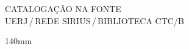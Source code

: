 %
% 


\begin{titlepage}
	\begin{center}
\vfill
\singlespacing
	\vspace*{95mm}
	{CATALOGAÇÃO NA FONTE\\ \vspace{1.5mm}
	UERJ\,/\,REDE SIRIUS\,/\,BIBLIOTECA CTC/B}\\
	\vspace{1.5mm}
	\begin{boxedminipage}{140mm}
	\begin{minipage}{5mm}
		\vspace{-84mm}
	\end{minipage}
	\hfill
	\raisebox{8.5mm}{
	\begin{minipage}[top]{115mm}
		\vspace*{5mm}


\end{minipage}}
\end{boxedminipage}
\end{center}
\end{titlepage}
